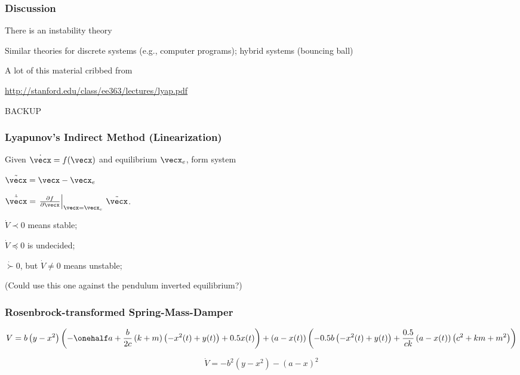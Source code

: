 \documentclass[12pt]{beamer}
\begin{document}
\begin{frame}
\frametitle{Discussion}

\begin{itemize}
\vitem
There is an instability theory

\vitem
Similar theories for discrete systems (e.g., computer programs);
hybrid systems (bouncing ball)

\vitem A lot of this material cribbed from

\url{http://stanford.edu/class/ee363/lectures/lyap.pdf}
\end{itemize}



\end{frame}









\begin{frame}
BACKUP
\end{frame}





\begin{frame}
\frametitle{Lyapunov's Indirect Method (Linearization)}

Given $\dot \vecx = f(\vecx)$ and equilibrium $\vecx_e$,
form system

$\tilde\vecx = \vecx - \vecx_e$

$\dot{\tilde\vecx}
	= \left.
		\frac{\partial f }{\partial\vecx} \right|_{\vecx=\vecx_e}
		\, \tilde\vecx$.



$\dot V \prec 0$ means stable;

$\dot V \preceq 0$ is undecided;

$\dot \succ 0$, but $\dot V \neq 0$ means unstable;

(Could use this one against the pendulum inverted equilibrium?)

\end{frame}







\begin{frame}
\frametitle{Rosenbrock-transformed Spring-Mass-Damper}

\begin{equation}
V = b \left( y - x^{2}\right)
	\left(
		-\onehalf a + \frac{b}{2c} \left(k + m\right) \left(- x^{2}{\left (t \right )} + y{\left (t \right )}\right) + 0.5 x{\left (t \right )}\right)
		+ \left(a - x{\left (t \right )}\right) \left(- 0.5 b \left(- x^{2}{\left (t \right )} + y{\left (t \right )}\right) + \frac{0.5}{c k} \left(a - x{\left (t \right )}\right) \left(c^{2} + k m + m^{2}\right)\right)
\end{equation}

\begin{equation}
\dot V = -b^2 \left( y - x^2 \right) - \left( a - x \right)^2
\end{equation}

\end{frame}
\end{document}
